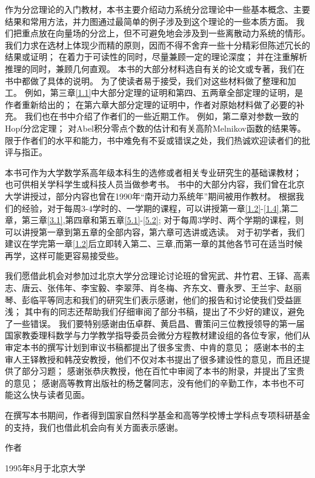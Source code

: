 作为分岔理论的入门教材，本书主要介绍动力系统分岔理论中一些基本概念、主要结果和常用方法，并力图通过最简单的例子涉及到这个理论的一些本质方面。
我们把重点放在向量场的分岔上，但不可避免地会涉及到一些离散动力系统的情形。
我们力求在选材上体现少而精的原则，因而不得不舍弃一些十分精彩但陈述冗长的结果或证明；
在着力于可读性的同时，尽量兼顾一定的理论深度；
并在注重解析推理的同时，兼顾几何直观。
本书的大部分材料选自有关的论文或专著，我们在书中都做了具体的说明。
为了使读者易于接受，我们对这些材料做了整理和加工。
例如，第三章\ref{1.1}中大部分定理的证明和第四、五两章全部定理的证明，是作者重新给出的；
在第六章大部分定理的证明中，作者对原始材料做了必要的补充。
我们也在书中介绍了作者们的一些近期工作。
例如，第二章对参数一致的Hopf分岔定理；
对Abel积分零点个数的估计和有关高阶Melnikov函数的结果等。
限于作者们的水平和能力，书中难免有不妥或错误之处，我们热诚欢迎读者们的批评与指正。


本书可作为大学数学系高年级本科生的选修或者相关专业研究生的基础课教材；
也可供相关学科学生或科技人员当做参考书。
书中的大部分内容，我们曾在北京大学讲授过，部分内容也曾在1990年“南开动力系统年”期间被用作教材。
根据我们的经验，对于每周3-4学时的、一学期的课程，可以讲授第一章\ref{1.2}-\ref{1.4},第二章，第三章\ref{3.1},第四章和第五章\ref{5.1}-\ref{5.2};
对于每周3学时、两个学期的课程，则可以讲授第一章到第五章的全部内容，第六章可选讲或选读。
对于初学者，我们建议在学完第一章\ref{1.2}后立即转入第二、三章,而第一章的其他各节可在适当时候再学，这样可能更容易接受些。


我们愿借此机会对参加过北京大学分岔理论讨论班的曾宪武、井竹君、王铎、高素志、唐云、张伟年、李宝毅、李翠萍、肖冬梅、齐东文、曹永罗、王兰宇、赵丽琴、彭临平等同志和我们的研究生们表示感谢，他们的报告和讨论使我们受益匪浅；
其中有的同志还帮助我们仔细审阅了部分书稿，提出了不少好的建议，避免了一些错误。
我们要特别感谢由伍卓群、黄启昌、曹策问三位教授领导的第一届国家教委理科数学与力学教学指导委员会微分方程教材建设组的各位专家，他们从审定本书的撰写计划到审议书稿都提出了很多宝贵、中肯的意见；
感谢本书的主审人王铎教授和韩茂安教授，他们不仅对本书提出了很多建设性的意见，而且还提供了部分习题；
感谢张恭庆教授，他在百忙中审阅了本书的附录，并提出了宝贵的意见；
感谢高等教育出版社的杨芝馨同志，没有他们的辛勤工作，本书也不可能这么快与读者见面。


在撰写本书期间，作者得到国家自然科学基金和高等学校博士学科点专项科研基金的支持，我们也借此机会向有关方面表示感谢。


作者


1995年8月于北京大学

